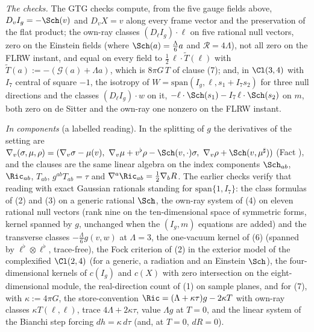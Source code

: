 \emph{The checks.} The GTG checks compute, from the five gauge fields above, $D_{v}I_g = -\Sch(v)$ and $D_{v}X = v$ along every frame vector and the preservation of the flat product; the own-ray classes $(D_{\ell}I_g)\cdot\ell$ on five rational null vectors, zero on the Einstein fields (where $\Sch(a) = \tfrac{\Lambda}{6}a$ and $\mathcal{R} = 4\Lambda$), not all zero on the FLRW instant, and equal on every field to $\tfrac12\,\ell\cdot\tilde T(\ell)$ with $\tilde T(a) := -(\mathcal{G}(a) + \Lambda a)$, which is $8\pi G\,T$ of clause (7); and, in $\Cl(3,4)$ with $I_{7}$ central of square $-1$, the isotropy of $W = \mathrm{span}(I_g, \ell, s_{1} + I_{7}s_{2})$ for three null directions and the classes $(D_{\ell}I_g)\cdot w$ on it, $-\ell\cdot\Sch(s_{1}) - I_{7}\,\ell\cdot\Sch(s_{2})$ on $m$, both zero on de Sitter and the own-ray one nonzero on the FLRW instant.

\emph{In components} (a labelled reading). In the splitting of $g$ the derivatives of the setting are $\nabla_{v}(\sigma, \mu, \rho) = (\nabla_{v}\sigma - \mu(v),\ \nabla_{v}\mu + v^{\flat}\rho - \Sch(v, \cdot)\sigma,\ \nabla_{v}\rho + \Sch(v, \mu^{\sharp}))$ (Fact ), and the clauses are the same linear algebra on the index components $\Sch_{ab}$, $\Ric_{ab}$, $T_{ab}$, $g^{ab}T_{ab} = \tau$ and $\nabla^{a}\Ric_{ab} = \tfrac12\nabla_{b}R$. The earlier checks verify that reading with exact Gaussian rationals standing for $\mathrm{span}\{1, I_{7}\}$: the class formulas of (2) and (3) on a generic rational $\Sch$, the own-ray system of (4) on eleven rational null vectors (rank nine on the ten-dimensional space of symmetric forms, kernel spanned by $g$, unchanged when the $(I_g, m)$ equations are added) and the transverse classes $-\tfrac{\Lambda}{6}g(v, w)$ at $\Lambda = 3$, the one-vacuum kernel of (6) (spanned by $\ell^{\flat}\otimes\ell^{\flat}$, trace-free), the Fock criterion of (2) in the exterior model of the complexified $\Cl(2,4)$ (for a generic, a radiation and an Einstein $\Sch$), the four-dimensional kernels of $c(I_g)$ and $c(X)$ with zero intersection on the eight-dimensional module, the real-direction count of (1) on sample planes, and for (7), with $\kappa := 4\pi G$, the store-convention $\Ric = (\Lambda + \kappa\tau)g - 2\kappa T$ with own-ray classes $\kappa T(\ell, \ell)$, trace $4\Lambda + 2\kappa\tau$, value $\Lambda g$ at $T = 0$, and the linear system of the Bianchi step forcing $dh = \kappa\,d\tau$ (and, at $T = 0$, $dR = 0$).
